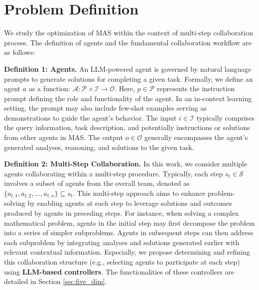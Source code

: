 
\section{Problem Definition} \label{sec:pro_def}

We study the optimization of MAS within the context of multi-step collaboration process. The definition of agents and the fundamental collaboration workflow are as follows:


\noindent \textbf{Definition 1: Agents.} An LLM-powered agent is governed by natural language prompts to generate solutions for completing a given task. Formally, we define an agent $a$ as  a function: $\mathcal{A}: \mathcal{P} \times \mathcal{I} \rightarrow \mathcal{O}$. Here, $p \in \mathcal{P}$ represents the instruction prompt defining the role and functionality of the agent. In an in-context learning setting, the prompt may also include few-shot examples serving as demonstrations to guide the agent’s behavior. The input $i \in \mathcal{I}$ typically comprises the query information, task description, and potentially instructions or solutions from other agents in MAS. The output $o \in \mathcal{O}$ generally encompasses the agent's generated analyses, reasoning, and solutions to the given task.


\noindent \textbf{Definition 2: Multi-Step Collaboration.} In this work, we consider multiple agents collaborating within a multi-step procedure. Typically, each step $s_t \in \mathcal{S}$ involves a subset of agents from the overall team, denoted as $\{a_{t,1}, a_{t,2}, ..., a_{t,n}\} \subseteq s_t$. This multi-step approach aims to enhance problem-solving by enabling agents at each step to leverage solutions and outcomes produced by agents in preceding steps. For instance, when solving a complex mathematical problem, agents in the initial step may first decompose the problem into a series of simpler subproblems. Agents in subsequent steps can then address each subproblem by integrating analyses and solutions generated earlier with relevant contextual information. 
Especially, we propose determining and refining this collaboration structure (e.g., selecting agents to participate at each step) using \textbf{LLM-based controllers}. The functionalities of these controllers are detailed in Section \ref{sec:five_dim}.


\endinput


